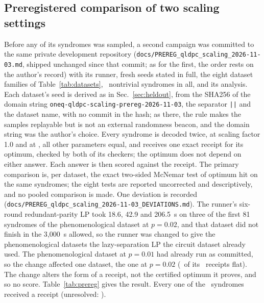 \documentclass[aps,pra,twocolumn,superscriptaddress,nofootinbib,longbibliography,floatfix]{revtex4-2}
\begin{document}
\subsection{Preregistered comparison of two scaling settings}
\label{sec:prereg}

Before any of its syndromes was sampled, a second campaign was committed to the same private development repository (\nolinkurl{docs/PREREG_qldpc_scaling_2026-11-03.md}, shipped unchanged since that commit; as for the first, the order rests on the author's record) with its runner, fresh seeds stated in full, the eight dataset families of Table~\ref{tab:datasets}, \PrShots\ nontrivial syndromes in all, and its analysis. Each dataset's seed is derived as in Sec.~\ref{sec:heldout}, from the SHA256 of the domain string \nolinkurl{oneq-qldpc-scaling-prereg-2026-11-03}, the separator \texttt{||} and the dataset name, with no commit in the hash; as there, the rule makes the samples replayable but is not an external randomness beacon, and the domain string was the author's choice. Every syndrome is decoded twice, at scaling factor 1.0 and at \ScaledAlpha, all other parameters equal, and receives one exact receipt for its optimum, checked by both of its checkers; the optimum does not depend on either answer. Each answer is then scored against the receipt. The primary comparison is, per dataset, the exact two-sided McNemar test of optimum hit on the same syndromes; the eight tests are reported uncorrected and descriptively, and no pooled comparison is made. One deviation is recorded (\nolinkurl{docs/PREREG_qldpc_scaling_2026-11-03_DEVIATIONS.md}). The runner's six-round redundant-parity LP took 18.6, 42.9 and 206.5~s on three of the first 81 syndromes of the phenomenological dataset at $p=0.02$, and that dataset did not finish in the 3{,}000~s allowed, so the runner was changed to give the phenomenological datasets the lazy-separation LP the circuit dataset already used. The phenomenological dataset at $p=0.01$ had already run as committed, so the change affected one dataset, the one at $p=0.02$ (\PrPhenTwoFlatReceipts\ of its \PrPhenTwoN\ receipts flat). The change alters the form of a receipt, not the certified optimum it proves, and so no score. Table~\ref{tab:prereg} gives the result. Every one of the \PrShots\ syndromes received a receipt (unresolved: \PrUnresolved).

\begin{table}[tbp]
\caption{The preregistered comparison: fresh syndromes, BP-OSD at min-sum scaling 1.0 (the class default) and \ScaledAlpha\ (the Sinter wrapper's default), every other setting equal. Hit: the answer is a correction whose integer objective equals the certified optimum; in parentheses, the hits proven by a branching tree, the rest being accepted by the syndrome's single dual. Every miss is a heavier correction (answers that are not a correction: \PrNotCorrection). ``1.0 only'', ``\ScaledAlpha\ only'': shots on which only that setting hits. McNemar: exact two-sided, uncorrected, one dataset at a time.}
\label{tab:prereg}

\end{table}
\end{document}
